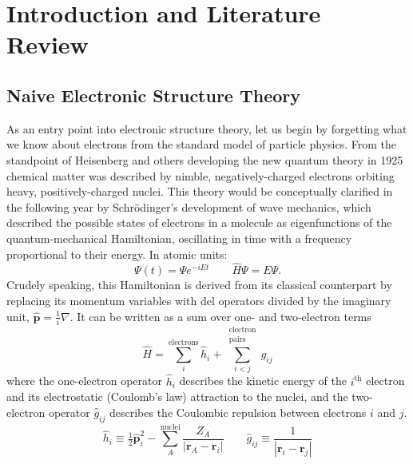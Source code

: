 \chapter[%
    Introduction and Literature Review
]{%
    Introduction and Literature Review
}

\section{Naive Electronic Structure Theory}

As an entry point into electronic structure theory, let us begin by forgetting
what we know about electrons from the standard model of particle physics.
From the standpoint of Heisenberg and others developing the new quantum theory
in 1925\cite{Heisenberg:1925p879} chemical matter was described by nimble,
negatively-charged electrons orbiting heavy, positively-charged nuclei.
This theory would be conceptually clarified in the following year by
Schr\"odinger's development of wave mechanics,
\cite{Schrodinger:1926p361,Schrodinger:1926p489,Schrodinger:1926p734} which
described the possible states of electrons in a molecule as eigenfunctions of
the quantum-mechanical Hamiltonian, oscillating in time with a frequency
proportional to their energy.
In atomic units:
\begin{equation}
    \Psi(t)
    =
    \Psi
    e^{-iEt}
    \qquad
    \hat{H}
    \Psi
    =
    E
    \Psi.
\end{equation}
Crudely speaking, this Hamiltonian is derived from its classical counterpart by
replacing its momentum variables with del operators divided by the imaginary
unit,
\(
    \hat{\mathbf{p}}
    =
    \frac{1}{i}
    \nabla
\).
It can be written as a sum over one- and two-electron terms
\begin{equation}
    \hat{H}
    =
    \sum_i^\text{electrons}
    \hat{h}_i
    +
    \sum_{i<j}^{\substack{\text{electron}\\\text{pairs}}}
    \hat{g}_{ij}
\end{equation}
where the one-electron operator
\(
    \hat{h}_i
\)
describes the kinetic energy of the \(i^\text{th}\) electron and its
electrostatic (Coulomb's law) attraction to the nuclei, and the two-electron
operator
\(
    \hat{g}_{ij}
\)
describes the Coulombic repulsion between electrons \(i\) and \(j\).
\begin{equation}
    \hat{h}_i
    \equiv
    \tfrac{1}{2}
    \hat{\mathbf{p}}_i^2
    -
    \sum_A^\text{nuclei}
    \frac{Z_A}{|\mathbf{r}_A - \mathbf{r}_i|}
    \qquad
    \hat{g}_{ij}
    \equiv
    \frac{1}{|\mathbf{r}_i - \mathbf{r}_j|}
\end{equation}

